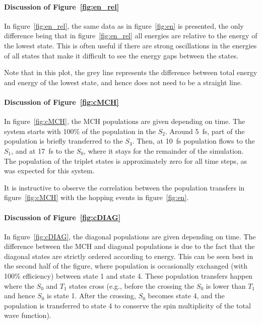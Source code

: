 \documentclass[a4paper,11pt,DIV=15,openany]{scrbook}
\begin{document}
\paragraph{Discussion of Figure~\ref{fig:en_rel}}

In figure~\ref{fig:en_rel}, the same data as in figure~\ref{fig:en} is presented, the only difference being that in figure~\ref{fig:en_rel} all energies are relative to the energy of the lowest state.
This is often useful if there are strong oscillations in the energies of all states that make it difficult to see the energy gaps between the states.

Note that in this plot, the grey line represents the difference between total energy and energy of the lowest state, and hence does not need to be a straight line.

\paragraph{Discussion of Figure~\ref{fig:cMCH}}

In figure~\ref{fig:cMCH}, the MCH populations are given depending on time. The system starts with 100\% of the population in the $S_2$. 
Around 5~fs, part of the population is briefly transferred to the $S_3$.
Then, at 10~fs population flows to the $S_1$, and at 17~fs to the $S_0$, where it stays for the remainder of the simulation.
The population of the triplet states is approximately zero for all time steps, as was expected for this system.

It is instructive to observe the correlation between the population transfers in figure~\ref{fig:cMCH} with the hopping events in figure~\ref{fig:en}.


\paragraph{Discussion of Figure~\ref{fig:cDIAG}}

In figure~\ref{fig:cDIAG}, the diagonal populations are given depending on time. 
The difference between the MCH and diagonal populations is due to the fact that the diagonal states are strictly ordered according to energy.
This can be seen best in the second half of the figure, where population is occasionally exchanged (with 100\% efficiency) between state 1 and state 4.
These population transfers happen where the $S_0$ and $T_1$ states cross (e.g., before the crossing the $S_0$ is lower than $T_1$ and hence $S_0$ is state 1. After the crossing, $S_0$ becomes state 4, and the population is transferred to state 4 to conserve the spin multiplicity of the total wave function).
\end{document}
